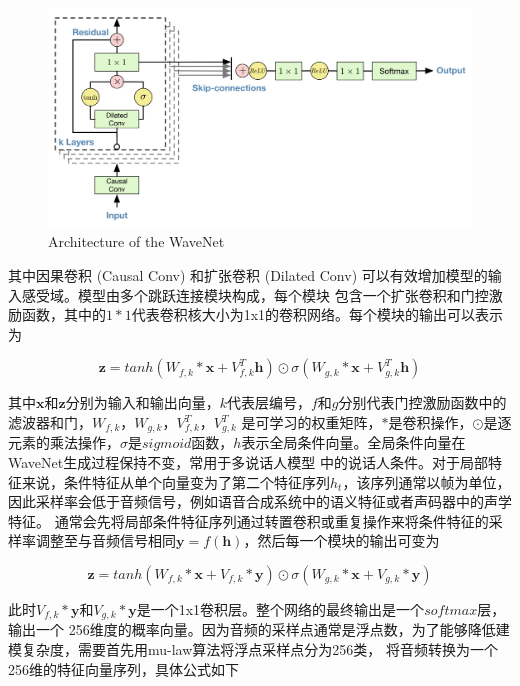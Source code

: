 \begin{figure}[!htp]
    \centering
    \includegraphics[width=12cm,trim=0 10 0 0,clip]{figure/4_wavenet.png}
    {Architecture of the WaveNet}
    \label{fig:wavenetarch}
\end{figure}

其中因果卷积 (Causal Conv) 和扩张卷积 (Dilated Conv) 可以有效增加模型的输入感受域。模型由多个跳跃连接模块构成，每个模块
包含一个扩张卷积和门控激励函数，其中的$1*1$代表卷积核大小为1x1的卷积网络。每个模块的输出可以表示为

\begin{equation}
    \mathbf{z} = tanh(W_{f,k} * \mathbf{x} + V^{T}_{f,k}\mathbf{h})\odot \sigma(W_{g,k} * \mathbf{x} + V^{T}_{g,k}\mathbf{h})
\end{equation}

其中$\mathbf{x}$和$\mathbf{z}$分别为输入和输出向量，$k$代表层编号，$f$和$g$分别代表门控激励函数中的滤波器和门，$W_{f,k}$，$W_{g,k}$，$V^T_{f,k}$，$V^T_{g,k}$
是可学习的权重矩阵，$*$是卷积操作，$\odot$是逐元素的乘法操作，$\sigma$是$sigmoid$函数，$h$表示全局条件向量。全局条件向量在WaveNet生成过程保持不变，常用于多说话人模型
中的说话人条件。对于局部特征来说，条件特征从单个向量变为了第二个特征序列$h_t$，该序列通常以帧为单位，因此采样率会低于音频信号，例如语音合成系统中的语义特征或者声码器中的声学特征。
通常会先将局部条件特征序列通过转置卷积或重复操作来将条件特征的采样率调整至与音频信号相同$\mathbf{y} = f(\mathbf{h})$，然后每一个模块的输出可变为

\begin{equation}
    \mathbf{z} = tanh(W_{f,k} * \mathbf{x} + V_{f,k} * \mathbf{y}) \odot \sigma (W_{g,k} * \mathbf{x} + V_{g,k} * \mathbf{y})
\end{equation}

此时$V_{f,k} * \mathbf{y}$和$V_{g,k} * \mathbf{y}$是一个1x1卷积层。整个网络的最终输出是一个$softmax$层，输出一个
256维度的概率向量。因为音频的采样点通常是浮点数，为了能够降低建模复杂度，需要首先用mu-law算法将浮点采样点分为256类，
将音频转换为一个256维的特征向量序列，具体公式如下

